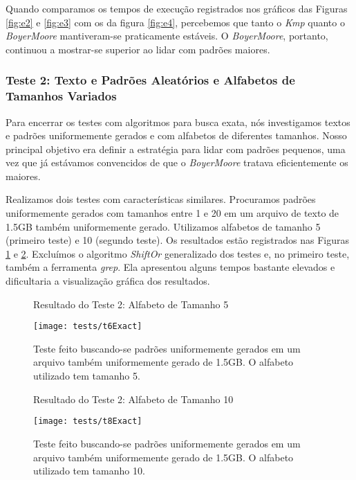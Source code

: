 \documentclass[]{article}
\newcommand{\figref}[1]{figura \ref{#1}}
\begin{document}
Quando comparamos os tempos de execução registrados nos gráficos das Figuras \ref{fig:e2} e \ref{fig:e3} com os da \figref{fig:e4}, percebemos que tanto o \textit{Kmp} quanto o \textit{BoyerMoore} mantiveram-se praticamente estáveis. O \textit{BoyerMoore}, portanto, continuou a mostrar-se superior ao lidar com padrões maiores.

\subsubsection{Teste 2: Texto e Padrões Aleatórios e Alfabetos de Tamanhos Variados}
Para encerrar os testes com algoritmos para busca exata, nós investigamos textos e padrões uniformemente gerados e com alfabetos de diferentes tamanhos. Nosso principal objetivo era definir a estratégia para lidar com padrões pequenos, uma vez que já estávamos convencidos de que o \textit{BoyerMoore} tratava eficientemente os maiores.

Realizamos dois testes com características similares. Procuramos padrões uniformemente gerados com tamanhos entre 1 e 20 em um arquivo de texto de 1.5GB também uniformemente gerado. Utilizamos alfabetos de tamanho 5 (primeiro teste) e 10 (segundo teste). Os resultados estão registrados nas Figuras \ref{fig:e5} e \ref{fig:e6}. Excluímos o algoritmo \textit{ShiftOr} generalizado dos testes e, no primeiro teste, também a ferramenta \textit{grep}. Ela apresentou alguns tempos bastante elevados e dificultaria a visualização gráfica dos resultados.

\begin{figure}[h]
	{\centering Resultado do Teste 2: Alfabeto de Tamanho 5\par}
	\texttt{[image: tests/t6Exact]}
\caption{Teste feito buscando-se padrões uniformemente gerados em um arquivo também uniformemente gerado de 1.5GB. O alfabeto utilizado tem tamanho 5.}
\label{fig:e5}
\end{figure}

\begin{figure}[h]
	{\centering Resultado do Teste 2: Alfabeto de Tamanho 10\par}
	\texttt{[image: tests/t8Exact]}
\caption{Teste feito buscando-se padrões uniformemente gerados em um arquivo também uniformemente gerado de 1.5GB. O alfabeto utilizado tem tamanho 10.}
\label{fig:e6}
\end{figure}
\end{document}
